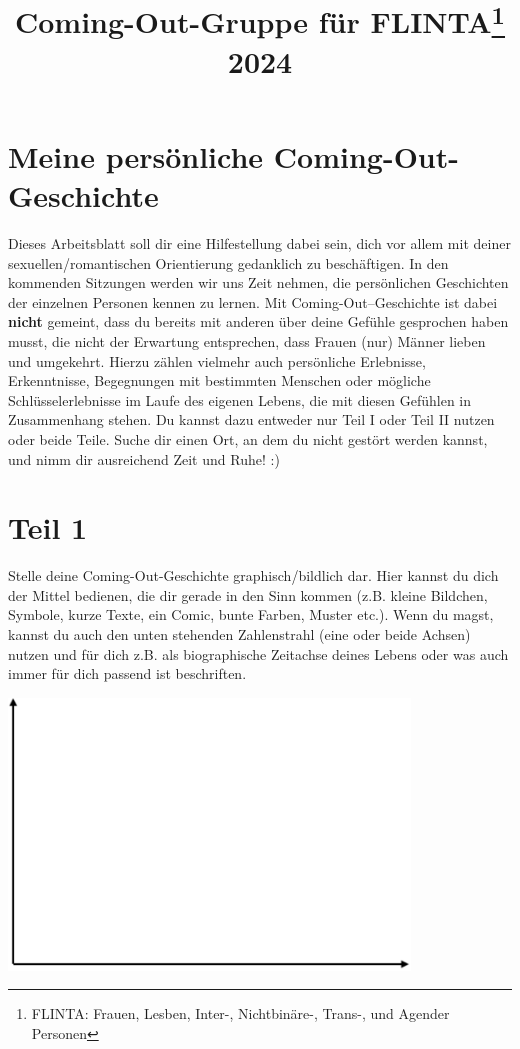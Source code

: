 \documentclass[a4paper,12pt]{article}
\title{Coming-Out-Gruppe für FLINTA\footnote{FLINTA: Frauen, Lesben, Inter-, Nichtbinäre-, Trans-, und Agender Personen} 2024}
\author{}
\date{}
\begin{document}
\maketitle

\section*{Meine persönliche Coming-Out-Geschichte}

Dieses Arbeitsblatt soll dir eine Hilfestellung dabei sein, dich vor allem mit deiner sexuellen/romantischen Orientierung gedanklich zu beschäftigen.  
In den kommenden Sitzungen werden wir uns Zeit nehmen, die persönlichen Geschichten der einzelnen Personen kennen zu lernen.  
Mit Coming-Out–Geschichte ist dabei \textbf{nicht} gemeint, dass du bereits mit anderen über deine Gefühle gesprochen haben musst, die nicht der Erwartung entsprechen, dass Frauen (nur) Männer lieben und umgekehrt.  
Hierzu zählen vielmehr auch persönliche Erlebnisse, Erkenntnisse, Begegnungen mit bestimmten Menschen oder mögliche Schlüsselerlebnisse im Laufe des eigenen Lebens, die mit diesen Gefühlen in Zusammenhang stehen.  
Du kannst dazu entweder nur Teil I oder Teil II nutzen oder beide Teile.  
Suche dir einen Ort, an dem du nicht gestört werden kannst, und nimm dir ausreichend Zeit und Ruhe! :)

\clearpage

\section*{Teil 1}

Stelle deine Coming-Out-Geschichte graphisch/bildlich dar. Hier kannst du dich der Mittel bedienen, die dir gerade in den Sinn kommen (z.B. kleine Bildchen, Symbole, kurze Texte, ein Comic, bunte Farben, Muster etc.). Wenn du magst, kannst du auch den unten stehenden Zahlenstrahl (eine oder beide Achsen) nutzen und für dich z.B. als biographische Zeitachse deines Lebens oder was auch immer für dich passend ist beschriften.

\begin{center}
    \includegraphics[width=0.8\textwidth]{zeitreihe.png}
\end{center}
\end{document}
